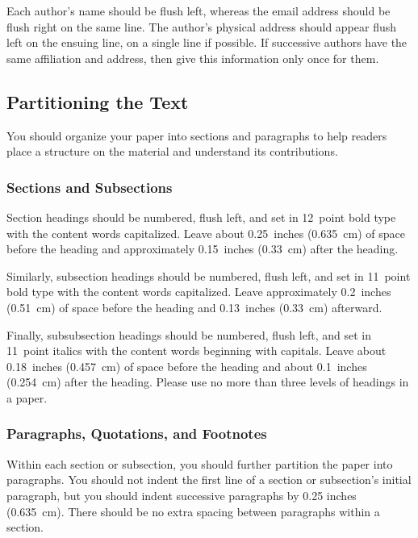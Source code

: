 \documentclass[11pt,letterpaper]{article}
\begin{document}
Each author's name should be flush left, whereas the email address
should be flush right on the same line. The author's physical address
should appear flush left on the ensuing line, on a single line if
possible. If successive authors have the same affiliation and address, 
then give this information only once for them. 

\subsection{Partitioning the Text} 

You should organize your paper into sections and paragraphs to help 
readers place a structure on the material and understand its 
contributions. 

\vspace{-0.018in}
\subsubsection{Sections and Subsections}
\vspace{-0.015in}

Section headings should be numbered, flush left, and set in 12~point 
bold type with the content words capitalized. Leave about 0.25~inches
(0.635~cm) of space before the heading and approximately 0.15~inches 
(0.33~cm) after the heading.

Similarly, subsection headings should be numbered, flush left, and 
set in 11~point bold type with the content words capitalized. Leave
approximately 0.2~inches (0.51~cm) of space before the heading and 
0.13~inches (0.33~cm) afterward.

Finally, subsubsection headings should be numbered, flush left, and
set in 11~point italics with the content words beginning with capitals. 
Leave about 0.18~inches (0.457~cm) of space before the heading and
about 0.1~inches (0.254~cm) after the heading. Please use no more 
than three levels of headings in a paper.

\subsubsection{Paragraphs, Quotations, and Footnotes}

Within each section or subsection, you should further partition 
the paper into paragraphs. You should not indent the first line 
of a section or subsection's initial paragraph, but you should
indent successive paragraphs by 0.25 inches (0.635~cm). There 
should be no extra spacing between paragraphs within a section. 
 
\end{document}
